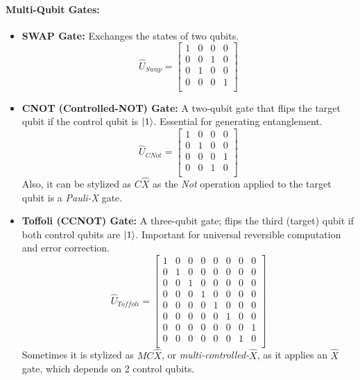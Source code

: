 \documentclass[encoding=utf8,british]{tumphthesis}
\begin{document}
        \paragraph{Multi-Qubit Gates:}
        \begin{itemize}
            \item \textbf{SWAP Gate:} Exchanges the states of two qubits.
            \begin{equation*}
               \hat{U}_{Swap} = \begin{bmatrix} 1 & 0 & 0 & 0 \\ 0 & 0 & 1 & 0 \\ 0 & 1 & 0 & 0 \\ 0 & 0 & 0 & 1 \\ \end{bmatrix} 
            \end{equation*}
            \item \textbf{CNOT (Controlled-NOT) Gate:} A two-qubit gate that flips the target qubit if the control qubit is $\left|1\right>$. 
            Essential for generating entanglement. 
            \begin{equation*}
                \hat{U}_{CNot} = \begin{bmatrix} 1 & 0 & 0 & 0 \\ 0 & 1 & 0 & 0 \\ 0 & 0 & 0 & 1 \\ 0 & 0 & 1 & 0 \\ \end{bmatrix}
            \end{equation*}
            Also, it can be stylized as $C\hat{X}$ as the \textit{Not} operation applied to the target qubit is a \textit{Pauli-X} gate.
            \item \textbf{Toffoli (CCNOT) Gate:} A three-qubit gate; flips the third (target) qubit if both control qubits are $\left|1\right>$. 
            Important for universal reversible computation and error correction.
            \begin{equation*}
                \hat{U}_{Toffoli} = \begin{bmatrix} 1 & 0 & 0 & 0 & 0 & 0 & 0 & 0 \\ 0 & 1 & 0 & 0 & 0 & 0 & 0 & 0 \\ 
                    0 & 0 & 1 & 0 & 0 & 0 & 0 & 0 \\ 0 & 0 & 0 & 1 & 0 & 0 & 0 & 0 \\ 
                    0 & 0 & 0 & 0 & 1 & 0 & 0 & 0 \\ 0 & 0 & 0 & 0 & 0 & 1 & 0 & 0 \\ 
                    0 & 0 & 0 & 0 & 0 & 0 & 0 & 1 \\ 0 & 0 & 0 & 0 & 0 & 0 & 1 & 0 \\ \end{bmatrix}
            \end{equation*}
            Sometimes it is stylized as $MC\hat{X}$, or \textit{multi-controlled-}$\hat{X}$, as it applies an $\hat{X}$ gate, which depends on 2 control qubits.
        \end{itemize}
\end{document}

